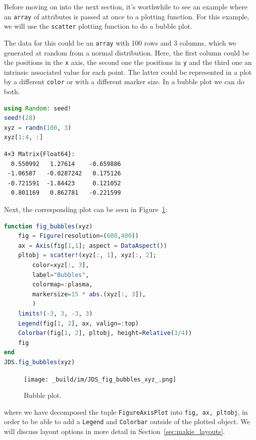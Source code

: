 \documentclass[
  notoc %
]{tufte-book}
\newcommand{\passthrough}[1]{#1}
\begin{document}
Before moving on into the next section, it's worthwhile to see an
example where an \passthrough{\lstinline!array!} of attributes is passed
at once to a plotting function. For this example, we will use the
\passthrough{\lstinline!scatter!} plotting function to do a bubble plot.

The data for this could be an \passthrough{\lstinline!array!} with 100
rows and 3 columns, which we generated at random from a normal
distribution. Here, the first column could be the positions in the
\passthrough{\lstinline!x!} axis, the second one the positions in
\passthrough{\lstinline!y!} and the third one an intrinsic associated
value for each point. The latter could be represented in a plot by a
different \passthrough{\lstinline!color!} or with a different marker
size. In a bubble plot we can do both.

\begin{lstlisting}[language=Julia]
using Random: seed!
seed!(28)
xyz = randn(100, 3)
xyz[1:4, :]
\end{lstlisting}

\begin{lstlisting}[language=Output]
4×3 Matrix{Float64}:
  0.550992   1.27614    -0.659886
 -1.06587   -0.0287242   0.175126
 -0.721591  -1.84423     0.121052
  0.801169   0.862781   -0.221599
\end{lstlisting}

Next, the corresponding plot can be seen in Figure~\ref{fig:bubble}:

\begin{lstlisting}[language=Julia]
function fig_bubbles(xyz)
    fig = Figure(resolution=(600,400))
    ax = Axis(fig[1,1]; aspect = DataAspect())
    pltobj = scatter!(xyz[:, 1], xyz[:, 2];
        color=xyz[:, 3],
        label="Bubbles",
        colormap=:plasma,
        markersize=15 * abs.(xyz[:, 3]),
        )
    limits!(-3, 3, -3, 3)
    Legend(fig[1, 2], ax, valign=:top)
    Colorbar(fig[1, 2], pltobj, height=Relative(3/4))
    fig
end
JDS.fig_bubbles(xyz)
\end{lstlisting}

\begin{figure}
\hypertarget{fig:bubble}{%
\centering
\texttt{[image: \_build/im/JDS\_fig\_bubbles\_xyz\_.png]}
\caption{Bubble plot.}\label{fig:bubble}
}
\end{figure}

where we have decomposed the tuple
\passthrough{\lstinline!FigureAxisPlot!} into
\passthrough{\lstinline!fig, ax, pltobj!}, in order to be able to add a
\passthrough{\lstinline!Legend!} and \passthrough{\lstinline!Colorbar!}
outside of the plotted object. We will discuss layout options in more
detail in Section~\ref{sec:makie_layouts}.
\end{document}
